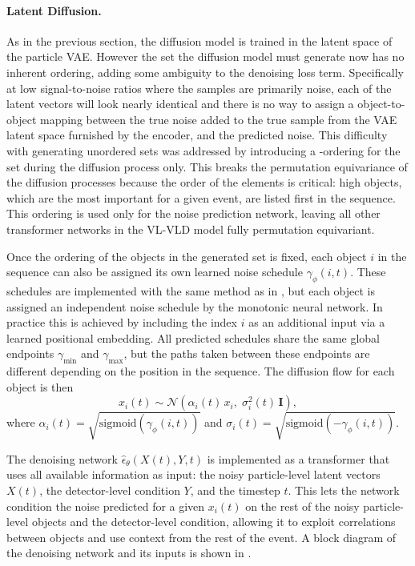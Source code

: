 \paragraph{Latent Diffusion.}
As in the previous section, the diffusion model is trained in the latent space of the particle VAE.
However the set the diffusion model must generate now has no inherent ordering, adding some ambiguity to the denoising loss term.
Specifically at low signal-to-noise ratios where the samples are primarily noise, each of the latent vectors will look nearly identical and there is no way to assign a object-to-object mapping between the true noise added to the true sample from the VAE latent space furnished by the encoder, and the predicted noise.
This difficulty with generating unordered sets was addressed by introducing a \pt-ordering for the set during the diffusion process only.
This breaks the permutation equivariance of the diffusion processes because the order of the elements is critical: high \pt objects, which are the most important for a given event, are listed first in the sequence.
This \pt ordering is used only for the noise prediction network, leaving all other transformer networks in the VL-VLD model fully permutation equivariant.

Once the ordering of the objects in the generated set is fixed, each object $i$ in the sequence can also be assigned its own learned noise schedule $\gamma_\phi(i, t)$.
These schedules are implemented with the same method as in , but each object is assigned an independent noise schedule by the monotonic neural network.
In practice this is achieved by including the index $i$ as an additional input via a learned positional embedding.
All predicted schedules share the same global endpoints $\gamma_\text{min}$ and $\gamma_\text{max}$, but the paths taken between these endpoints are different depending on the position in the sequence.
The diffusion flow for each object is then
\begin{equation}
  x_i(t) \sim \mathcal{N}\!\left(\alpha_i(t)\, x_i,\; \sigma_i^2(t)\, \mathbf{I}\right),
\end{equation}
where $\alpha_i(t) = \sqrt{\mathrm{sigmoid}(\gamma_\phi(i,t))}$ and $\sigma_i(t) = \sqrt{\mathrm{sigmoid}(-\gamma_\phi(i,t))}$.

The denoising network $\hat{\epsilon}_\theta(X(t), Y, t)$ is implemented as a transformer that uses all available information as input: the noisy particle-level latent vectors $X(t)$, the detector-level condition $Y$, and the timestep $t$.
This lets the network condition the noise predicted for a given $x_i(t)$ on the rest of the noisy particle-level objects and the detector-level condition, allowing it to exploit correlations between objects and use context from the rest of the event.
A block diagram of the denoising network and its inputs is shown in .

